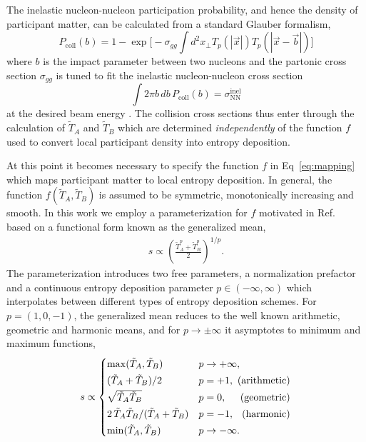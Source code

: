 \documentclass[aps,prc,reprint,amsmath,nofootinbib,superscriptaddress]{revtex4-1}
\newcommand{\T}{\tilde{T}}
\begin{document}
The inelastic nucleon-nucleon participation probability, and hence the density of participant matter, can be calculated from a standard Glauber formalism,
\begin{equation}
  P_\text{coll}(b) =
    1 - \exp\biggl[
      -\sigma_{gg} \int d^2x_\perp T_p(|\vec{x}|) T_p(|\vec{x} - \vec{b}|)
    \biggr]
\end{equation}
where $b$ is the impact parameter between two nucleons and the partonic cross section $\sigma_{gg}$ is tuned to fit the inelastic nucleon-nucleon cross section
\begin{equation}
  \int 2 \pi b\, db\, P_\text{coll}(b) = \sigma_\text{NN}^\text{inel}
\end{equation}
at the desired beam energy \cite{?}. The collision cross sections thus enter through the calculation of $\T_A$ and $\T_B$ which are determined \emph{independently} of the function $f$ used to convert local participant density into entropy deposition.

At this point it becomes necessary to specify the function $f$ in Eq~\eqref{eq:mapping} which maps participant matter to local entropy deposition. In general, the function $f(\T_A, \T_B)$ is assumed to be symmetric, monotonically increasing and smooth. In this work we employ a parameterization for $f$ motivated in Ref.~\cite{Moreland:2014oya} based on a functional form known as the generalized mean,
\begin{align}
  s \propto \left( \frac{\T_A^p + \T_B^p}{2} \right)^{1/p}.
  \label{eq:genmean}
\end{align}
The parameterization introduces two free parameters, a normalization prefactor and a continuous entropy deposition parameter $p\in(-\infty, \infty)$ which interpolates between different types of entropy deposition schemes. For ${p=(1, 0, -1)}$, the generalized mean reduces to the well known arithmetic, geometric and harmonic means, and for $p\rightarrow \pm\infty$ it asymptotes to minimum and maximum functions,
\begin{equation}
  \newlength{\extraspace}
  \setlength{\extraspace}{0.5ex}
  s \propto
  \begin{cases}
    \max(\T_A, \T_B) & p \rightarrow +\infty, \\[\extraspace]
    (\T_A + \T_B)/2 & p = +1, \hfill \text{ (arithmetic)} \\[\extraspace]
    \sqrt{\T_A \T_B} & p = 0, \hfill \text{ (geometric)} \\[\extraspace]
    2\, \T_A \T_B/(\T_A + \T_B) & p = -1, \hfill \text{ (harmonic)} \\[\extraspace]
    \min(\T_A, \T_B) & p \rightarrow -\infty.
  \end{cases}
  \label{eq:means}
\end{equation}
\end{document}
